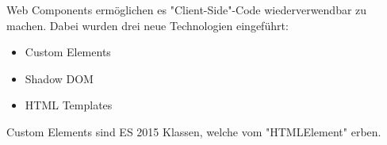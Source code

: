 

Web Components ermöglichen es "Client-Side"-Code wiederverwendbar zu machen. Dabei wurden drei neue Technologien eingeführt:

\begin{itemize}
    \item Custom Elements
    \item Shadow DOM
    \item HTML Templates
\end{itemize}

\cite{MDNWebComponents}


Custom Elements sind ES 2015 Klassen, welche vom "HTMLElement" erben. 
